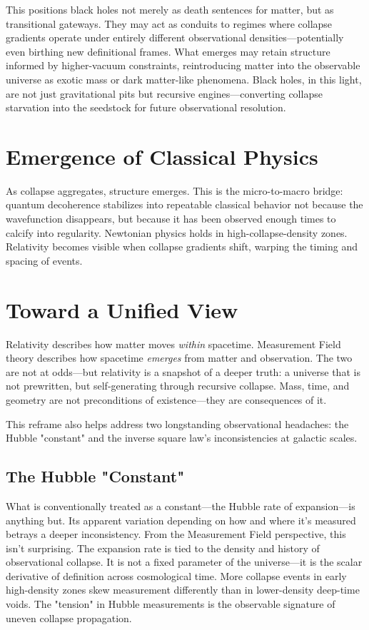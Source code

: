 This positions black holes not merely as death sentences for matter, but as transitional gateways. They may act as conduits to regimes where collapse gradients operate under entirely different observational densities—potentially even birthing new definitional frames. What emerges may retain structure informed by higher-vacuum constraints, reintroducing matter into the observable universe as exotic mass or dark matter-like phenomena. Black holes, in this light, are not just gravitational pits but recursive engines—converting collapse starvation into the seedstock for future observational resolution.

\section{Emergence of Classical Physics}

As collapse aggregates, structure emerges. This is the micro-to-macro bridge: quantum decoherence stabilizes into repeatable classical behavior not because the wavefunction disappears, but because it has been observed enough times to calcify into regularity. Newtonian physics holds in high-collapse-density zones. Relativity becomes visible when collapse gradients shift, warping the timing and spacing of events.

\section{Toward a Unified View}

Relativity describes how matter moves \textit{within} spacetime. Measurement Field theory describes how spacetime \textit{emerges} from matter and observation. The two are not at odds—but relativity is a snapshot of a deeper truth: a universe that is not prewritten, but self-generating through recursive collapse. Mass, time, and geometry are not preconditions of existence—they are consequences of it.

This reframe also helps address two longstanding observational headaches: the Hubble "constant" and the inverse square law’s inconsistencies at galactic scales.

\subsection{The Hubble "Constant"}

What is conventionally treated as a constant—the Hubble rate of expansion—is anything but. Its apparent variation depending on how and where it's measured betrays a deeper inconsistency. From the Measurement Field perspective, this isn't surprising. The expansion rate is tied to the density and history of observational collapse. It is not a fixed parameter of the universe—it is the scalar derivative of definition across cosmological time. More collapse events in early high-density zones skew measurement differently than in lower-density deep-time voids. The "tension" in Hubble measurements is the observable signature of uneven collapse propagation.

